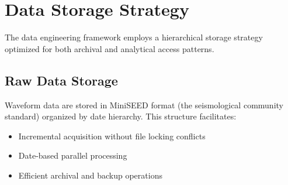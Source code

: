 \section{Data Storage Strategy}

The data engineering framework employs a hierarchical storage strategy
optimized for both archival and analytical access patterns.

\subsection{Raw Data Storage}
Waveform data are stored in MiniSEED format (the seismological community
standard) organized by date hierarchy. This structure facilitates:
\begin{itemize}
  \item Incremental acquisition without file locking conflicts
  \item Date-based parallel processing
  \item Efficient archival and backup operations
\end{itemize}

